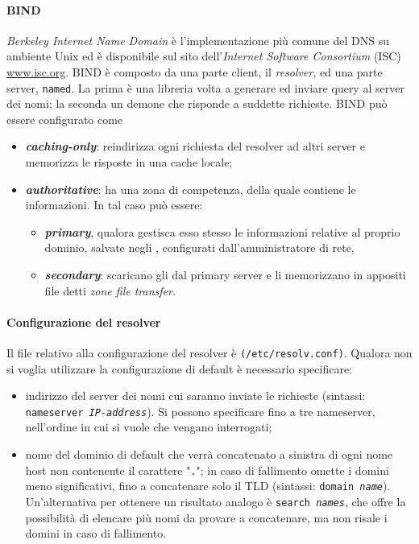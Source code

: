 \documentclass[a4paper,11pt]{article}
\def\code#1{\texttt{#1}}
\def\vedi#1{\nameref{#1}}
\def\italic#1{\textit{#1}}
\begin{document}
\paragraph{BIND} \textit{Berkeley Internet Name Domain} è l'implementazione più comune del DNS su ambiente Unix ed è disponibile sul sito dell'\italic{Internet Software Consortium} (ISC) \url{www.isc.org}. BIND è composto da una parte client, il \textit{resolver}, ed una parte server, \code{named}. La prima è una libreria volta a generare ed inviare query al server dei nomi; la seconda un demone che risponde a suddette richieste. 
BIND può essere configurato come 
\begin{itemize}
\item \italic{\textbf{caching-only}}: reindirizza ogni richiesta del resolver ad altri server e memorizza le risposte in una cache locale;
\item \textbf{\textit{authoritative}}: ha una zona di competenza, della quale contiene le informazioni. In tal caso può essere: 
\begin{itemize}
\item \italic{\textbf{primary}}, qualora gestisca esso stesso le informazioni relative al proprio dominio, salvate negli \vedi{Zone file}, configurati dall'amministratore di rete,
\item \italic{\textbf{secondary}}: scaricano gli \vedi{Zone file} dal primary server e li memorizzano in appositi file detti \italic{zone file transfer}.
\end{itemize}
\end{itemize}
\paragraph{Configurazione del resolver} Il file relativo alla configurazione del resolver è \code{(/etc/resolv.conf)}. Qualora non si voglia utilizzare la configurazione di default è necessario specificare:
\begin{itemize}
\item indirizzo del server dei nomi cui saranno inviate le richieste (sintassi: \code{nameserver \textit{IP-address}}). Si possono specificare fino a tre nameserver, nell'ordine in cui si vuole che vengano interrogati;
\item nome del dominio di default che verrà concatenato a sinistra di ogni nome host non contenente il carattere "\code{.}"; in caso di fallimento omette i domini meno significativi, fino a concatenare solo il TLD (sintassi: \code{domain \textit{name}}). Un'alternativa per ottenere un risultato analogo è \code{search \textit{names}}, che offre la possibilità di elencare più nomi da provare a concatenare, ma non risale i domini in caso di fallimento.
\end{itemize}
\end{document}

